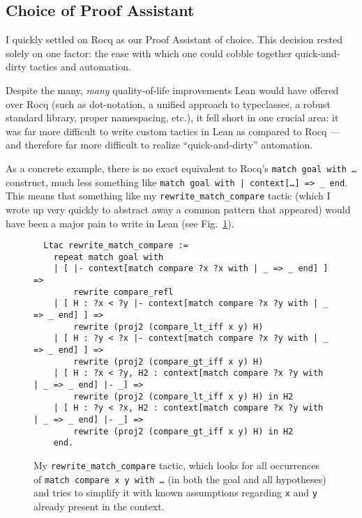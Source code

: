 \documentclass[acmsmall, authorversion, nonacm, overload]{acmart}
\begin{document}
\subsection{Choice of Proof Assistant}
I quickly settled on Rocq as our Proof Assistant of choice.
This decision rested solely on one factor: the ease with which one could cobble together
quick-and-dirty tactics and automation.

Despite the many, \emph{many} quality-of-life improvements Lean would have offered over Rocq
(such as dot-notation, a unified approach to typeclasses, a robust standard library,
proper namespacing, etc.), it fell short in one crucial area:
it was far more difficult to write custom tactics in Lean as compared to Rocq --- and therefore far more
difficult to realize ``quick-and-dirty'' automation.

As a concrete example, there is no exact equivalent to Rocq's \texttt{match goal with \dots} construct,
much less something like \texttt{match goal with | context[\dots] => _ end}.
This means that something like my \texttt{rewrite_match_compare} tactic (which I wrote up very quickly to
abstract away a common pattern that appeared) would have been a major pain to write in Lean
(see Fig.\ \ref{fig:rewrite_match_compare}).

\begin{figure}[h!]
\begin{verbatim}
  Ltac rewrite_match_compare :=
    repeat match goal with
    | [ |- context[match compare ?x ?x with | _ => _ end] ] =>
        rewrite compare_refl
    | [ H : ?x < ?y |- context[match compare ?x ?y with | _ => _ end] ] =>
        rewrite (proj2 (compare_lt_iff x y) H)
    | [ H : ?y < ?x |- context[match compare ?x ?y with | _ => _ end] ] =>
        rewrite (proj2 (compare_gt_iff x y) H)
    | [ H : ?x < ?y, H2 : context[match compare ?x ?y with | _ => _ end] |- _] =>
        rewrite (proj2 (compare_lt_iff x y) H) in H2
    | [ H : ?y < ?x, H2 : context[match compare ?x ?y with | _ => _ end] |- _] =>
        rewrite (proj2 (compare_gt_iff x y) H) in H2
    end.
\end{verbatim}
\caption{My \texttt{rewrite_match_compare} tactic, which looks for all occurrences of
  \texttt{match compare x y with \dots} (in both the goal and all hypotheses)
  and tries to simplify it with known assumptions regarding \texttt{x} and \texttt{y} already present in the context.}%
\label{fig:rewrite_match_compare}
\end{figure}
\end{document}
